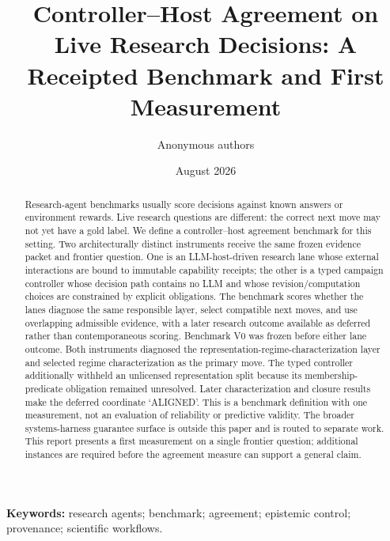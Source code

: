 \documentclass[11pt]{article}
\title{Controller--Host Agreement on Live Research Decisions: A Receipted Benchmark and First Measurement}
\author{Anonymous authors}
\date{August 2026}
\begin{document}
\maketitle
\begin{abstract}
Research-agent benchmarks usually score decisions against known answers or environment rewards. Live research questions are different: the correct next move may not yet have a gold label. We define a controller--host agreement benchmark for this setting. Two architecturally distinct instruments receive the same frozen evidence packet and frontier question. One is an LLM-host-driven research lane whose external interactions are bound to immutable capability receipts; the other is a typed campaign controller whose decision path contains no LLM and whose revision/computation choices are constrained by explicit obligations. The benchmark scores whether the lanes diagnose the same responsible layer, select compatible next moves, and use overlapping admissible evidence, with a later research outcome available as deferred rather than contemporaneous scoring. Benchmark V0 was frozen before either lane outcome. Both instruments diagnosed the representation-regime-characterization layer and selected regime characterization as the primary move. The typed controller additionally withheld an unlicensed representation split because its membership-predicate obligation remained unresolved. Later characterization and closure results make the deferred coordinate `ALIGNED'. This is a benchmark definition with one measurement, not an evaluation of reliability or predictive validity. The broader systems-harness guarantee surface is outside this paper and is routed to separate work. This report presents a first measurement on a single frontier question; additional instances are required before the agreement measure can support a general claim.
\end{abstract}

\noindent\textbf{Keywords:} research agents; benchmark; agreement; epistemic control; provenance; scientific workflows.













\end{document}

